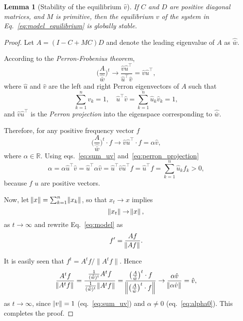 \documentclass[9pt, a4paper, twocolumn]{extarticle}
\newcommand*{\tr}{^\intercal}
\newcommand{\goesto}{\rightarrow}
\newtheorem{lemma}{Lemma}
\begin{document}
\begin{lemma}[Stability of the equilibrium $\hat v$]
If $C$ and $D$ are positive diagonal matrices, and $M$ is primitive, 
then the equilibrium $v$ of the system in Eq.~\ref{eq:model_equilibrium} is globally stable.
\end{lemma}

\begin{proof}
Let $A=(I-C+MC)D$ and denote the leading eigenvalue of $A$ as $\hat{\bar w}$.

According to the \emph{Perron-Frobenius theorem}, 
\begin{equation}
\bigg(\frac{A}{\hat{\bar w}}\bigg)^t \goesto \frac{\hat v \hat u\tr}{\hat u\tr \hat v} = \hat v \hat u\tr,
\end{equation}
where $\hat u$ and $\hat v$ are the left and right Perron eigenvectors of $A$ such that 
\begin{equation}
\sum_{k=1}^{n}{v_k}=1, \quad
\hat u\tr \hat v=\sum_{k=1}^{n}{\hat u_k \hat v_k}=1,
\label{eq:sum_uv}
\end{equation}
and $\hat v \hat u\tr$ is the \emph{Perron projection} into the eigenspace corresponding to $\hat{\bar w}$.

Therefore, for any positive frequency vector $f$
\begin{equation}
\bigg(\frac{A}{\hat{\bar w}}\bigg)^t \cdot f \goesto \hat v \hat u\tr \cdot f = \alpha \hat v,
\label{eq:perron_projection}
\end{equation}
where $\alpha \in \mathbb{R}$.
Using eqs.~\ref{eq:sum_uv} and~\ref{eq:perron_projection}
\begin{equation}
\alpha = \alpha \hat u\tr \hat v = \hat u\tr \alpha \hat v = \hat u\tr \hat v \hat u\tr f = \hat u\tr f = \sum_{k=1}^{n}{\hat u_k f_k} > 0,
\label{eq:alpha0}
\end{equation}
because $f$  $u$ are positive vectors.

Now, let $\norm{x} = \sum_{k=1}^{n}\norm{x_k}$, so that $x_t \goesto x$ implies
\begin{equation}
\norm{x_t} \goesto \norm{x},
\label{eq:norm_limit}
\end{equation}
as $t \goesto \infty$ and rewrite Eq.~\ref{eq:model} as 
\begin{equation}
f' = \frac{A f}{\norm{A f}}. 
\label{eq:model_norm}
\end{equation}

It is easily seen that $f^t =A^tf/\|A^tf\|$. Hence 
\begin{multline}
\frac{A^t f}{\norm{A^t f}} = 
\frac{\frac{1}{(\hat{\bar w})^t} A^t f}{\frac{1}{(\hat{\bar w})^t} \norm{A^t f}} = 
\frac{\big(\frac{A}{\hat{\bar w}}\big)^t \cdot f }{ \norm{ \big(\frac{A}{\hat{\bar w}}\big)^t \cdot f }} \goesto
\frac{\alpha \hat v}{\norm{\alpha \hat v}} = \hat v,
\end{multline}
as $t \goesto \infty$, since $\norm{v}=1$ (eq.~\ref{eq:sum_uv}) and $\alpha \ne 0$ (eq.~\ref{eq:alpha0}).
This completes the proof.
\end{proof}
\end{document}
